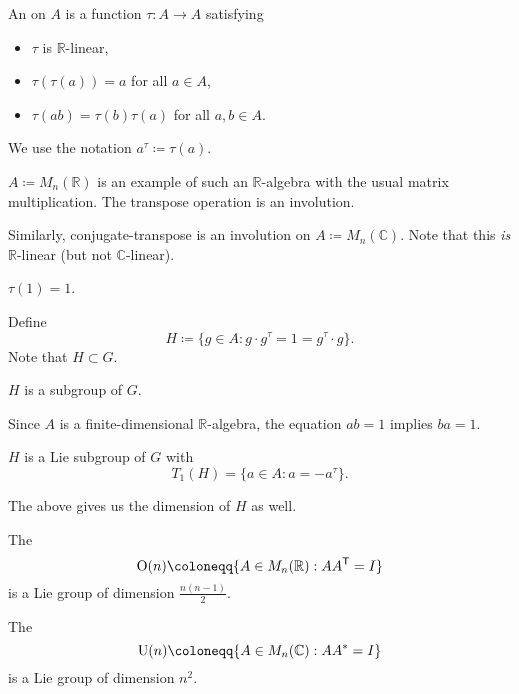 \documentclass[12pt]{article}
\begin{document}
\begin{defn}
	An  on $A$ is a function $\tau \colon A \to A$ satisfying
	\begin{itemize}
		\item $\tau$ is $\mathbb{R}$-linear,
		\item $\tau(\tau(a)) = a$ for all $a \in A$,
		\item $\tau(ab) = \tau(b) \tau(a)$ for all $a, b \in A$.
	\end{itemize}
\end{defn}
We use the notation $a^{\tau} \coloneqq \tau(a)$.

\begin{ex}
	$A \coloneqq M_{n}(\mathbb{R})$ is an example of such an $\mathbb{R}$-algebra with the usual matrix multiplication. \newline
	The transpose operation is an involution.

	Similarly, conjugate-transpose is an involution on $A \coloneqq M_{n}(\mathbb{C})$. Note that this \emph{is} $\mathbb{R}$-linear (but not $\mathbb{C}$-linear).
\end{ex}

\begin{lem}
	$\tau(1) = 1$.
\end{lem}

Define
\begin{equation*} 
	H \coloneqq \{g \in A : g \cdot g^{\tau} = 1 = g^{\tau} \cdot g\}.
\end{equation*}
Note that $H \subset G$.

\begin{lem}
	$H$ is a subgroup of $G$.
\end{lem}

\begin{rem}
	Since $A$ is a finite-dimensional $\mathbb{R}$-algebra, the equation $ab = 1$ implies $ba = 1$.
\end{rem}

\begin{thm}
	$H$ is a Lie subgroup of $G$ with
	\begin{equation*} 
		T_{1}(H) = \{a \in A : a = -a^{\tau}\}.
	\end{equation*}
\end{thm}
The above gives us the dimension of $H$ as well.

\begin{ex} \label{ex:orthogonal-unitary-groups-dimensions}
	The 
	\begin{equation*} 
		\OO(n) \coloneqq \{A \in M_{n}(\mathbb{R}) : A A^{\trans} = I\}
	\end{equation*}
	is a Lie group of dimension $\frac{n(n - 1)}{2}$.

	The 
	\begin{equation*} 
		\UU(n) \coloneqq \{A \in M_{n}(\mathbb{C}) : A A^{\ast} = I\}
	\end{equation*}
	is a Lie group of dimension $n^{2}$.
\end{ex}
\end{document}
